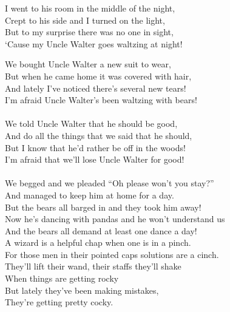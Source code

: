 \documentclass[twoside,13pt,openany,letterpaper]{memoir}%
\begin{document}

I went to his room in the middle of the night,\\
Crept to his side and I turned on the light,\\
But to my surprise there was no one in sight,\\
‘Cause my Uncle Walter goes waltzing at night!\\


We bought Uncle Walter a new suit to wear,\\
But when he came home it was covered with hair,\\
And lately I've noticed there's several new tears!\\
I’m afraid Uncle Walter's been waltzing with bears!\\
\\
We told Uncle Walter that he should be good,\\
And do all the things that we said that he should,\\
But I know that he'd rather be off in the woods!\\
I'm afraid that we’ll lose Uncle Walter for good!\\
\\
We begged and we pleaded “Oh please won’t you stay?”\\
And managed to keep him at home for a day.\\
But the bears all barged in and they took him away!\\
Now he's dancing with pandas and he won’t understand us\\
And the bears all demand at least one dance a day!\\

A wizard is a helpful chap when one is in a pinch.\\
For those men in their pointed caps solutions are a cinch.\\
They'll lift their wand, their staffs they'll shake\\
When things are getting rocky\\
But lately they've been making mistakes,\\
They're getting pretty cocky.\\
\end{document}
